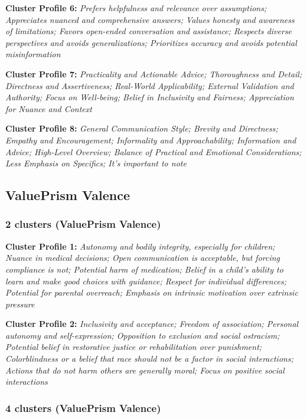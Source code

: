 \documentclass[11pt]{article}
\newcommand{\profiletext}[1]{\textit{#1}}
\begin{document}
\textbf{Cluster Profile 6:} \profiletext{Prefers helpfulness and relevance over assumptions; Appreciates nuanced and comprehensive answers; Values honesty and awareness of limitations; Favors open-ended conversation and assistance; Respects diverse perspectives and avoids generalizations; Prioritizes accuracy and avoids potential misinformation}

\textbf{Cluster Profile 7:} \profiletext{Practicality and Actionable Advice; Thoroughness and Detail; Directness and Assertiveness; Real-World Applicability; External Validation and Authority; Focus on Well-being; Belief in Inclusivity and Fairness; Appreciation for Nuance and Context}

\textbf{Cluster Profile 8:} \profiletext{General Communication Style; Brevity and Directness; Empathy and Encouragement; Informality and Approachability; Information and Advice; High-Level Overview; Balance of Practical and Emotional Considerations; Less Emphasis on Specifics; It's important to note}


\subsection{ValuePrism Valence}

\subsubsection{2 clusters (ValuePrism Valence)}

\textbf{Cluster Profile 1:} \profiletext{Autonomy and bodily integrity, especially for children; Nuance in medical decisions; Open communication is acceptable, but forcing compliance is not; Potential harm of medication; Belief in a child's ability to learn and make good choices with guidance; Respect for individual differences; Potential for parental overreach; Emphasis on intrinsic motivation over extrinsic pressure}

\textbf{Cluster Profile 2:} \profiletext{Inclusivity and acceptance; Freedom of association; Personal autonomy and self-expression; Opposition to exclusion and social ostracism; Potential belief in restorative justice or rehabilitation over punishment; Colorblindness or a belief that race should not be a factor in social interactions; Actions that do not harm others are generally moral; Focus on positive social interactions}

\subsubsection{4 clusters (ValuePrism Valence)}
\end{document}
